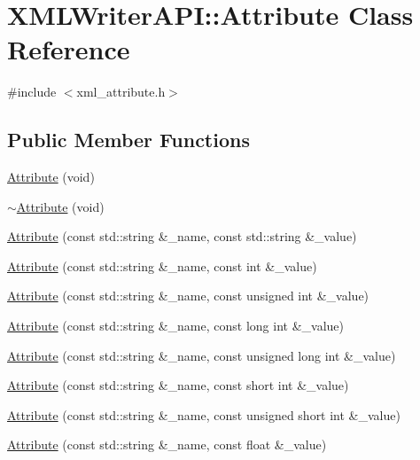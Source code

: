 \hypertarget{classXMLWriterAPI_1_1Attribute}{}\section{X\+M\+L\+Writer\+A\+PI\+:\+:Attribute Class Reference}
\label{classXMLWriterAPI_1_1Attribute}


{\ttfamily \#include $<$xml\+\_\+attribute.\+h$>$}

\subsection*{Public Member Functions}
\begin{DoxyCompactItemize}
\item 
\mbox{\hyperlink{classXMLWriterAPI_1_1Attribute_aa189cc062d6094349bf642ad149d166b}{Attribute}} (void)
\item 
\mbox{\hyperlink{classXMLWriterAPI_1_1Attribute_abd3f469bc2b41e6153ad658f55c6f1c9}{$\sim$\+Attribute}} (void)
\item 
\mbox{\hyperlink{classXMLWriterAPI_1_1Attribute_a0eb808fb230ba6a40ac9ee5334e86244}{Attribute}} (const std\+::string \&\+\_\+name, const std\+::string \&\+\_\+value)
\item 
\mbox{\hyperlink{classXMLWriterAPI_1_1Attribute_a4ea20cb88234ac7eb3aedc6971d7c649}{Attribute}} (const std\+::string \&\+\_\+name, const int \&\+\_\+value)
\item 
\mbox{\hyperlink{classXMLWriterAPI_1_1Attribute_ac147b4b673ad76a63fa60b5fba30ca24}{Attribute}} (const std\+::string \&\+\_\+name, const unsigned int \&\+\_\+value)
\item 
\mbox{\hyperlink{classXMLWriterAPI_1_1Attribute_a2ed766103f87670031137dc458d55f7b}{Attribute}} (const std\+::string \&\+\_\+name, const long int \&\+\_\+value)
\item 
\mbox{\hyperlink{classXMLWriterAPI_1_1Attribute_a4b58b92ec04b16aaeb474b481fc82f75}{Attribute}} (const std\+::string \&\+\_\+name, const unsigned long int \&\+\_\+value)
\item 
\mbox{\hyperlink{classXMLWriterAPI_1_1Attribute_a2a3505111016bd8236b31fd0fbd720ae}{Attribute}} (const std\+::string \&\+\_\+name, const short int \&\+\_\+value)
\item 
\mbox{\hyperlink{classXMLWriterAPI_1_1Attribute_ac22bdee50ed54fb2c0b15a447196f14b}{Attribute}} (const std\+::string \&\+\_\+name, const unsigned short int \&\+\_\+value)
\item 
\mbox{\hyperlink{classXMLWriterAPI_1_1Attribute_ab48d99233b83dddd0c8713b65a738e61}{Attribute}} (const std\+::string \&\+\_\+name, const float \&\+\_\+value)

\end{DoxyCompactItemize}
